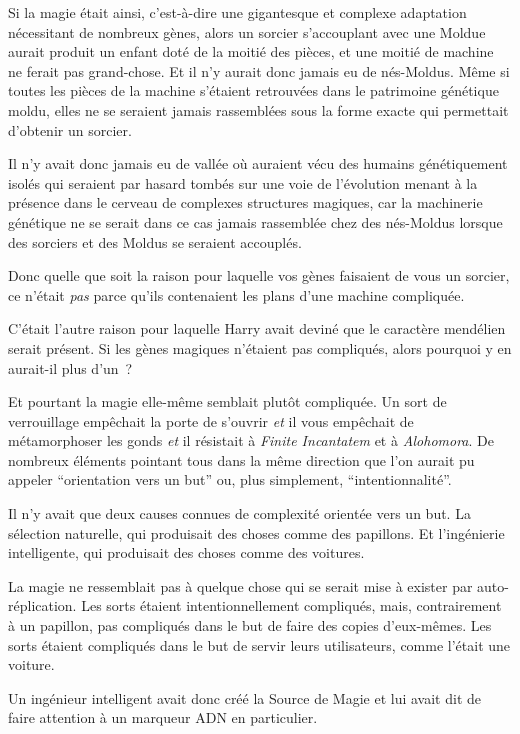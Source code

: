 Si la magie était ainsi, c'est-à-dire une gigantesque et complexe adaptation nécessitant de nombreux gènes, alors un sorcier s'accouplant avec une Moldue aurait produit un enfant doté de la moitié des pièces, et une moitié de machine ne ferait pas grand-chose. Et il n'y aurait donc jamais eu de nés-Moldus. Même si toutes les pièces de la machine s'étaient retrouvées dans le patrimoine génétique moldu, elles ne se seraient jamais rassemblées sous la forme exacte qui permettait d'obtenir un sorcier.

Il n'y avait donc jamais eu de vallée où auraient vécu des humains génétiquement isolés qui seraient par hasard tombés sur une voie de l'évolution menant à la présence dans le cerveau de complexes structures magiques, car la machinerie génétique ne se serait dans ce cas jamais rassemblée chez des nés-Moldus lorsque des sorciers et des Moldus se seraient accouplés.

Donc quelle que soit la raison pour laquelle vos gènes faisaient de vous un sorcier, ce n'était \emph{pas} parce qu'ils contenaient les plans d'une machine compliquée.

C'était l'autre raison pour laquelle Harry avait deviné que le caractère mendélien serait présent. Si les gènes magiques n'étaient pas compliqués, alors pourquoi y en aurait-il plus d'un~?

Et pourtant la magie elle-même semblait plutôt compliquée. Un sort de verrouillage empêchait la porte de s'ouvrir \emph{et} il vous empêchait de métamorphoser les gonds \emph{et} il résistait à \emph{Finite Incantatem} et à \emph{Alohomora}. De nombreux éléments pointant tous dans la même direction que l'on aurait pu appeler “orientation vers un but” ou, plus simplement, “intentionnalité”.

Il n'y avait que deux causes connues de complexité orientée vers un but. La sélection naturelle, qui produisait des choses comme des papillons. Et l'ingénierie intelligente, qui produisait des choses comme des voitures.

La magie ne ressemblait pas à quelque chose qui se serait mise à exister par auto-réplication. Les sorts étaient intentionnellement compliqués, mais, contrairement à un papillon, pas compliqués dans le but de faire des copies d'eux-mêmes. Les sorts étaient compliqués dans le but de servir leurs utilisateurs, comme l'était une voiture.

Un ingénieur intelligent avait donc créé la Source de Magie et lui avait dit de faire attention à un marqueur ADN en particulier.

